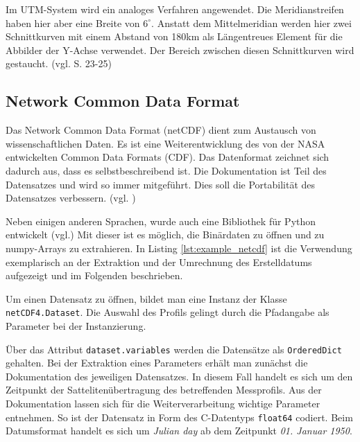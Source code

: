 Im UTM-System wird ein analoges Verfahren angewendet. Die Meridianstreifen haben hier aber eine Breite von $6^\circ$. Anstatt dem Mittelmeridian werden hier zwei Schnittkurven mit einem Abstand von 180km als Längentreues Element für die Abbilder der Y-Achse verwendet. Der Bereich zwischen diesen Schnittkurven wird gestaucht. (vgl. \cite{witte2011vermessungskunde} S. 23-25)   

    

    \subsection{Network Common Data Format}
    
    Das Network Common Data Format (netCDF) dient zum Austausch von wissenschaftlichen Daten. Es ist eine Weiterentwicklung des von der NASA entwickelten Common Data Formats (CDF). Das Datenformat zeichnet sich dadurch aus, dass es selbstbeschreibend ist. Die Dokumentation ist Teil des Datensatzes und wird so immer  mitgeführt. Dies soll die Portabilität des Datensatzes verbessern.  (vgl. \cite{FisherNetCDF})
   
    Neben einigen anderen Sprachen, wurde auch eine Bibliothek für Python entwickelt (vgl.\cite{netCDF4}) Mit dieser ist es möglich, die Binärdaten zu öffnen und zu numpy-Arrays zu extrahieren. In Listing \ref{lst:example_netcdf} ist die Verwendung exemplarisch an der Extraktion und der Umrechnung des Erstelldatums  aufgezeigt und im Folgenden beschrieben.
    
    
    Um einen Datensatz zu öffnen, bildet man eine Instanz der Klasse \texttt{netCDF4.Dataset}. Die Auswahl des Profils gelingt durch die Pfadangabe als Parameter bei der Instanzierung.
    
    Über das Attribut \texttt{dataset.variables} werden die Datensätze als \texttt{OrderedDict} gehalten. Bei der Extraktion eines Parameters erhält man zunächst die Dokumentation des jeweiligen Datensatzes. In diesem Fall handelt es sich um den Zeitpunkt der Sattelitenübertragung des betreffenden Messprofils.
    Aus der Dokumentation lassen sich für die Weiterverarbeitung wichtige Parameter entnehmen.
    So ist der Datensatz in Form des C-Datentyps \texttt{float64} codiert. Beim Datumsformat handelt es sich um \textit{Julian day} ab dem Zeitpunkt \textit{01. Januar 1950}.
    
